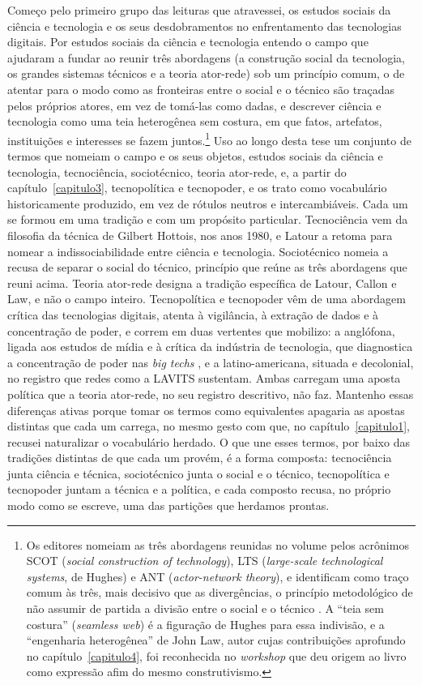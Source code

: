 Começo pelo primeiro grupo das leituras que atravessei, os estudos sociais da ciência e tecnologia e os seus desdobramentos no enfrentamento das tecnologias digitais. Por estudos sociais da ciência e tecnologia entendo o campo que \textcite{Bijker2012Social} ajudaram a fundar ao reunir três abordagens (a construção social da tecnologia, os grandes sistemas técnicos e a teoria ator-rede) sob um princípio comum, o de atentar para o modo como as fronteiras entre o social e o técnico são traçadas pelos próprios atores, em vez de tomá-las como dadas, e descrever ciência e tecnologia como uma teia heterogênea sem costura, em que fatos, artefatos, instituições e interesses se fazem juntos.\footnote{Os editores nomeiam as três abordagens reunidas no volume pelos acrônimos SCOT (\textit{social construction of technology}), LTS (\textit{large-scale technological systems}, de Hughes) e ANT (\textit{actor-network theory}), e identificam como traço comum às três, mais decisivo que as divergências, o princípio metodológico de não assumir de partida a divisão entre o social e o técnico \parencite[pp.~xvi--xvii]{Bijker2012Social}. A \enquote{teia sem costura} (\textit{seamless web}) é a figuração de Hughes para essa indivisão, e a \enquote{engenharia heterogênea} de John Law, autor cujas contribuições aprofundo no capítulo~\ref{capitulo4}, foi reconhecida no \textit{workshop} que deu origem ao livro como expressão afim do mesmo construtivismo.} Uso ao longo desta tese um conjunto de termos que nomeiam o campo e os seus objetos, estudos sociais da ciência e tecnologia, tecnociência, sociotécnico, teoria ator-rede, e, a partir do capítulo~\ref{capitulo3}, tecnopolítica e tecnopoder, e os trato como vocabulário historicamente produzido, em vez de rótulos neutros e intercambiáveis. Cada um se formou em uma tradição e com um propósito particular. Tecnociência vem da filosofia da técnica de Gilbert Hottois, nos anos 1980, e Latour a retoma para nomear a indissociabilidade entre ciência e tecnologia. Sociotécnico nomeia a recusa de separar o social do técnico, princípio que reúne as três abordagens que reuni acima. Teoria ator-rede designa a tradição específica de Latour, Callon e Law, e não o campo inteiro. Tecnopolítica e tecnopoder vêm de uma abordagem crítica das tecnologias digitais, atenta à vigilância, à extração de dados e à concentração de poder, e correm em duas vertentes que mobilizo: a anglófona, ligada aos estudos de mídia e à crítica da indústria de tecnologia, que diagnostica a concentração de poder nas \textit{big techs} \parencite{Kak2023Confronting}, e a latino-americana, situada e decolonial, no registro que redes como a LAVITS sustentam. Ambas carregam uma aposta política que a teoria ator-rede, no seu registro descritivo, não faz. Mantenho essas diferenças ativas porque tomar os termos como equivalentes apagaria as apostas distintas que cada um carrega, no mesmo gesto com que, no capítulo~\ref{capitulo1}, recusei naturalizar o vocabulário herdado. O que une esses termos, por baixo das tradições distintas de que cada um provém, é a forma composta: tecnociência junta ciência e técnica, sociotécnico junta o social e o técnico, tecnopolítica e tecnopoder juntam a técnica e a política, e cada composto recusa, no próprio modo como se escreve, uma das partições que herdamos prontas. 